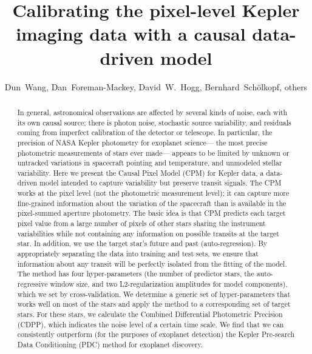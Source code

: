 \documentclass[12pt, preprint]{aastex}
\begin{document}
\title{
  Calibrating the pixel-level Kepler imaging data with a causal data-driven model
 \\ 
}
\author{%
  Dun~Wang\altaffilmark{\ref{CCPP}},
  Dan~Foreman-Mackey\altaffilmark{\ref{CCPP}},
  David~W.~Hogg\altaffilmark{\ref{CCPP},\ref{CDS},\ref{MPIA},\ref{email}},
  Bernhard~Sch\"olkopf\altaffilmark{\ref{MPIIS}},
  others%
}
\setcounter{address}{1}


\begin{abstract}
In general, astronomical observations are affected by several kinds of noise, each with its own causal source; 
there is photon noise, stochastic source variability, and residuals coming from imperfect calibration of the detector or telescope. 
In particular, the precision of NASA Kepler photometry for exoplanet science—
the most precise photometric measurements of stars ever made—
appears to be limited by unknown or untracked variations in spacecraft pointing and temperature, 
and unmodeled stellar variability. Here we present the Causal Pixel Model (CPM) for Kepler data, 
a data-driven model intended to capture variability but preserve transit signals. 
The CPM works at the pixel level (not the photometric measurement level); 
it can capture more fine-grained information about the variation of the spacecraft than is available in the pixel-summed aperture photometry. 
The basic idea is that CPM predicts each target pixel value from a large number of pixels of other stars sharing the instrument variabilities 
while not containing any information on possible transits at the target star. In addition, we use the target star’s future and past (auto-regression). 
By appropriately separating the data into training and test sets, we ensure that information about any transit will be perfectly isolated from the fitting of the model. 
The method has four hyper-parameters (the number of predictor stars, the auto-regressive window size, 
and two L2-regularization amplitudes for model components), which we set by cross-validation. 
We determine a generic set of hyper-parameters that works well on most of the stars and apply the method to a corresponding set of target stars. 
For these stars, we calculate the Combined Differential Photometric Precision (CDPP), which indicates the noise level of a certain time scale. 
We find that we can consistently outperform (for the purposes of exoplanet detection) the Kepler Pre-search Data Conditioning (PDC) method for exoplanet discovery.

\end{abstract}
\end{document}
